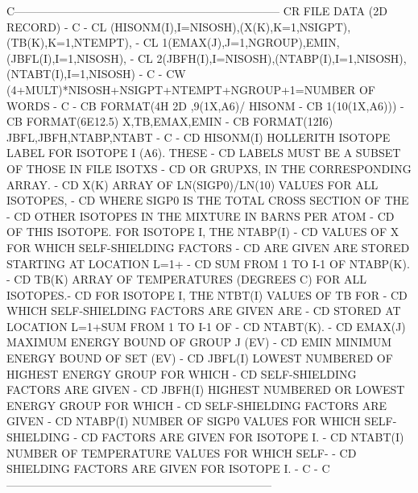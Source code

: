 \begin{ccode}
C-----------------------------------------------------------------------
CR          FILE DATA   (2D RECORD)                                    -
C                                                                      -
CL    (HISONM(I),I=NISOSH),(X(K),K=1,NSIGPT),(TB(K),K=1,NTEMPT),       -
CL   1(EMAX(J),J=1,NGROUP),EMIN,(JBFL(I),I=1,NISOSH),                  -
CL   2(JBFH(I),I=NISOSH),(NTABP(I),I=1,NISOSH),(NTABT(I),I=1,NISOSH)   -
C                                                                      -
CW    (4+MULT)*NISOSH+NSIGPT+NTEMPT+NGROUP+1=NUMBER OF WORDS           -
C                                                                      -
CB    FORMAT(4H 2D ,9(1X,A6)/          HISONM                          -
CB   1(10(1X,A6)))                                                     -
CB    FORMAT(6E12.5)                   X,TB,EMAX,EMIN                  -
CB    FORMAT(12I6)                     JBFL,JBFH,NTABP,NTABT           -
C                                                                      -
CD    HISONM(I)     HOLLERITH ISOTOPE LABEL FOR ISOTOPE I (A6).  THESE -
CD                     LABELS MUST BE A SUBSET OF THOSE IN FILE ISOTXS -
CD                     OR GRUPXS, IN THE CORRESPONDING ARRAY.          -
CD    X(K)          ARRAY OF LN(SIGP0)/LN(10) VALUES FOR ALL ISOTOPES, -
CD                     WHERE SIGP0 IS THE TOTAL CROSS SECTION OF THE   -
CD                     OTHER ISOTOPES IN THE MIXTURE IN BARNS PER ATOM -
CD                     OF THIS ISOTOPE.  FOR ISOTOPE I, THE NTABP(I)   -
CD                     VALUES OF X FOR WHICH SELF-SHIELDING FACTORS    -
CD                     ARE GIVEN ARE STORED STARTING AT LOCATION L=1+  -
CD                     SUM FROM 1 TO I-1 OF NTABP(K).                  -
CD    TB(K)         ARRAY OF TEMPERATURES (DEGREES C) FOR ALL ISOTOPES.-
CD                     FOR ISOTOPE I, THE NTBT(I) VALUES OF TB FOR     -
CD                     WHICH SELF-SHIELDING FACTORS ARE GIVEN ARE      -
CD                     STORED AT LOCATION L=1+SUM FROM 1 TO I-1 OF     -
CD                     NTABT(K).                                       -
CD    EMAX(J)       MAXIMUM ENERGY BOUND OF GROUP J (EV)               -
CD    EMIN          MINIMUM ENERGY BOUND OF SET (EV)                   -
CD    JBFL(I)       LOWEST NUMBERED OF HIGHEST ENERGY GROUP FOR WHICH  -
CD                     SELF-SHIELDING FACTORS ARE GIVEN                -
CD    JBFH(I)       HIGHEST NUMBERED OR LOWEST ENERGY GROUP FOR WHICH  -
CD                     SELF-SHIELDING FACTORS ARE GIVEN                -
CD    NTABP(I)      NUMBER OF SIGP0 VALUES FOR WHICH SELF-SHIELDING    -
CD                     FACTORS ARE GIVEN FOR ISOTOPE I.                -
CD    NTABT(I)      NUMBER OF TEMPERATURE VALUES FOR WHICH SELF-       -
CD                     SHIELDING FACTORS ARE GIVEN FOR ISOTOPE I.      -
C                                                                      -
C-----------------------------------------------------------------------


\end{ccode}
